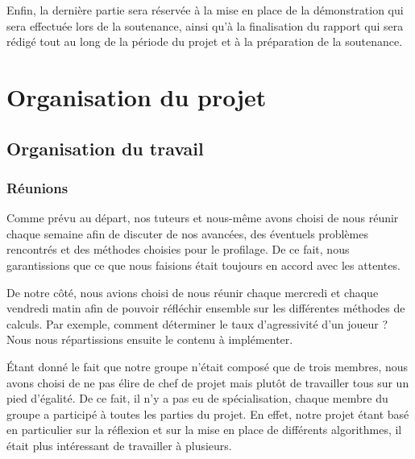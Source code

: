 \documentclass{report}
\begin{document}
Enfin, la dernière partie sera réservée à la mise en place de la démonstration qui sera effectuée lors de la soutenance, ainsi qu'à la finalisation du rapport qui sera rédigé tout au long de la période du projet et à la préparation de la soutenance.\par

\chapter{Organisation du projet}



\section{Organisation du travail}

\subsection{Réunions}
\hspace{0.5cm}Comme prévu au départ, nos tuteurs et nous-même avons choisi de nous réunir chaque semaine afin de discuter de nos avancées, des éventuels problèmes rencontrés et des méthodes choisies pour le profilage. De ce fait, nous garantissions que ce que nous faisions était toujours en accord avec les attentes.\par
De notre côté, nous avions choisi de nous réunir chaque mercredi et chaque vendredi matin afin de pouvoir réfléchir ensemble sur les différentes méthodes de calculs. Par exemple, comment déterminer le taux d'agressivité d'un joueur ? Nous nous répartissions ensuite le contenu à implémenter.\par
Étant donné le fait que notre groupe n'était composé que de trois membres, nous avons choisi de ne pas élire de chef de projet mais plutôt de travailler tous sur un pied d'égalité. De ce fait, il n'y a pas eu de spécialisation, chaque membre du groupe a participé à toutes les parties du projet. En effet, notre projet étant basé en particulier sur la réflexion et sur la mise en place de différents algorithmes, il était plus intéressant de travailler à plusieurs.\par
\end{document}
